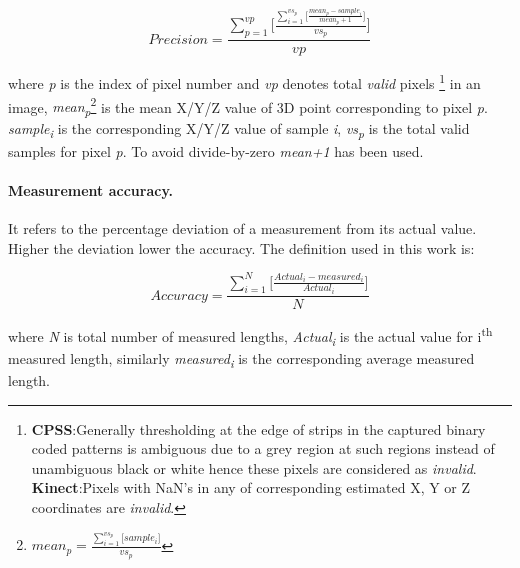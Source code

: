 \begin{equation}
Precision=\frac{\sum_{p=1}^{vp}\Bigg[\frac{\sum_{i=1}^{vs_{p}}\Bigg[\frac{mean_{p}-sample_{i}}{mean_{p}+1}\Bigg]}{vs_{p}}\Bigg]}{vp}
\end{equation}

\noindent
where \textit{p} is the index of pixel number and \textit{vp} denotes total \textit{valid} pixels \footnote{\textbf{CPSS}:Generally thresholding at the edge of strips in the captured binary coded patterns is \indent \indent ambiguous due to a grey region at such regions instead of unambiguous black or white hence \indent \indent these pixels are considered as \textit{invalid}.\newline
\indent \indent \textbf{Kinect}:Pixels with NaN's in any of corresponding estimated X, Y or Z coordinates are \indent \indent \textit{invalid}.} in an image, \textit{mean\textsubscript{p}}\footnote{$mean_p=\frac{\sum_{i=1}^{vs_{p}}\big[sample_{i}\big]}{vs_{p}}$} is the mean X/Y/Z value of 3D point corresponding to pixel \textit{p}. \textit{sample\textsubscript{i}} is the corresponding X/Y/Z value of sample \textit{i}, \textit{vs\textsubscript{p}} is the total valid samples for pixel \textit{p}. To avoid divide-by-zero \textit{mean+1} has been used.


\paragraph{Measurement accuracy.}
\label{def:accuracy}
It refers to the percentage deviation of a measurement from its actual value. Higher the deviation lower the accuracy. The definition used in this work is:


\begin{equation}
Accuracy=\frac{\sum_{i=1}^{N}\Bigg[\frac{Actual_{i}-measured_{i}}{Actual_{i}}\Bigg]}{N}
\end{equation}

\noindent
where \textit{N} is total number of measured lengths, \textit{Actual\textsubscript{i}} is the actual value for i\textsuperscript{th} measured length, similarly \textit{measured\textsubscript{i}} is the corresponding average measured length.


